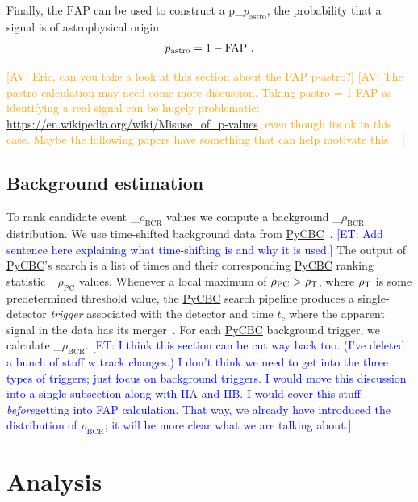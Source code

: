 \documentclass[%
 nofootinbib,
 amsmath,amssymb,
 aps,
 twocolumn,
 superscriptaddress
]{revtex4-2}
\newcommand{\pycbc}{{\sc \href{https://pycbc.org/}{{PyCBC}}}\xspace}
\newcommand{\fancytext}[1]{{\relax\ifmmode#1\else $#1$\fi}\xspace}
\newcommand{\mathcmd}[1]{{\sc \relax\ifmmode#1\else $#1$\fi}\xspace}
\newcommand{\bcr}{\mathcmd{\rho_\text{BCR}}}
\newcommand{\pycbcstat}{\mathcmd{\rho_\text{PC}}}
\newcommand{\snr}{\mathcmd{\rho}}
\newcommand{\fap}{\mathcmd{\text{FAP}}}
\newcommand{\pastro}{\fancytext{p_\text{astro}}}
\newcommand{\avi}[1]{\textcolor{orange}{[AV: #1]}}
\newcommand{\et}[1]{\textcolor{blue}{[ET: #1]}}
\begin{document}
Finally, the \fap can be used to construct a \pastro, the probability that a signal is of astrophysical origin~\cite{pastro_1,pastro_2,pastro_3}
\begin{equation}
    \pastro = 1 -  \fap \ .
\end{equation}

\avi{Eric, can you take a look at this section about the FAP p-astro?}
\avi{
The pastro calculation may need some more discussion. Taking pastro = 1-FAP as identifying a real signal can be hugely problematic: \url{https://en.wikipedia.org/wiki/Misuse_of_p-values}, even though its ok in this case. Maybe the following papers have something that can help motivate this ~\cite{Farr:2015:PhRvD, Gaebel:2019:MNRAS,Galaudage:2020:PhRvD}
}


\subsection{Background estimation}

To rank candidate event \bcr values we compute a background \bcr distribution. We use time-shifted background data from \pycbc~\cite{pycbc_og4}. \et{Add sentence here explaining what time-shifting is and why it is used.} The output of \pycbc's search is a list of times and their corresponding \pycbc ranking statistic \pycbcstat values. Whenever a local maximum of $\pycbcstat > \snr_\text{T}$, where $\snr_\text{T}$ is some predetermined threshold value, the \pycbc search pipeline produces a single-detector \textit{trigger} associated with the detector and time $t_c$ where the apparent signal in the data has its merger~\cite{pycbc_og6}.
For each \pycbc background trigger, we calculate \bcr.
\et{I think this section can be cut way back too. (I've deleted a bunch of stuff w track changes.) I don't think we need to get into the three types of triggers; just focus on background triggers. I would move this discussion into a single subsection along with IIA and IIB. I would cover this stuff \textit{before}getting into FAP calculation. That way, we already have introduced the distribution of $\rho_\text{BCR}$; it will be more clear what we are talking about.}

\section{Analysis}\label{sec:Analysis}
\end{document}
